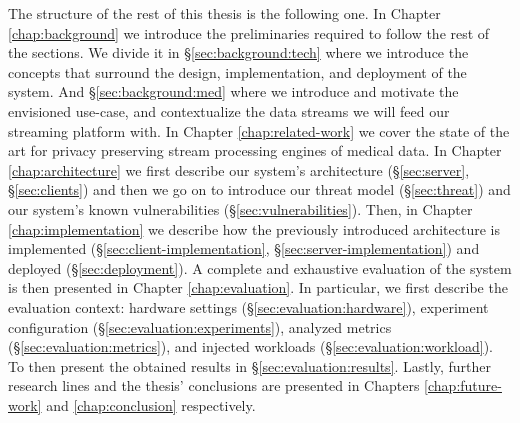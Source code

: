 The structure of the rest of this thesis is the following one.
In Chapter \ref{chap:background} we introduce the preliminaries required to follow the rest of the sections.
We divide it in \S\ref{sec:background:tech} where we introduce the concepts that surround the design, implementation, and deployment of the system.
And \S\ref{sec:background:med} where we introduce and motivate the envisioned use-case, and contextualize the data streams we will feed our streaming platform with.
In Chapter \ref{chap:related-work} we cover the state of the art for privacy preserving stream processing engines of medical data.
In Chapter \ref{chap:architecture} we first describe our system's architecture (\S\ref{sec:server}, \S\ref{sec:clients}) and then we go on to introduce our threat model (\S\ref{sec:threat}) and our system's known vulnerabilities (\S\ref{sec:vulnerabilities}).
Then, in Chapter \ref{chap:implementation} we describe how the previously introduced architecture is implemented (\S\ref{sec:client-implementation}, \S\ref{sec:server-implementation}) and deployed (\S\ref{sec:deployment}).
A complete and exhaustive evaluation of the system is then presented in Chapter \ref{chap:evaluation}.
In particular, we first describe the evaluation context: hardware settings (\S\ref{sec:evaluation:hardware}), experiment configuration (\S\ref{sec:evaluation:experiments}), analyzed metrics (\S\ref{sec:evaluation:metrics}), and injected workloads (\S\ref{sec:evaluation:workload}).
To then present the obtained results in \S\ref{sec:evaluation:results}.
Lastly, further research lines and the thesis' conclusions are presented in Chapters \ref{chap:future-work} and \ref{chap:conclusion} respectively.
